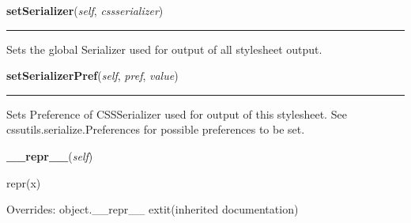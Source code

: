    \label{cssutils:css:cssstylesheet:CSSStyleSheet:setSerializer}

    \vspace{0.5ex}

\hspace{.8\funcindent}\begin{boxedminipage}{\funcwidth}

    \raggedright \textbf{setSerializer}(\textit{self}, \textit{cssserializer})

    \vspace{-1.5ex}

    \rule{\textwidth}{0.5\fboxrule}
\setlength{\parskip}{2ex}

Sets the global Serializer used for output of all stylesheet
output.
\setlength{\parskip}{1ex}
    \end{boxedminipage}

    \label{cssutils:css:cssstylesheet:CSSStyleSheet:setSerializerPref}

    \vspace{0.5ex}

\hspace{.8\funcindent}\begin{boxedminipage}{\funcwidth}

    \raggedright \textbf{setSerializerPref}(\textit{self}, \textit{pref}, \textit{value})

    \vspace{-1.5ex}

    \rule{\textwidth}{0.5\fboxrule}
\setlength{\parskip}{2ex}

Sets Preference of CSSSerializer used for output of this
stylesheet. See cssutils.serialize.Preferences for possible
preferences to be set.
\setlength{\parskip}{1ex}
    \end{boxedminipage}

    \vspace{0.5ex}

\hspace{.8\funcindent}\begin{boxedminipage}{\funcwidth}

    \raggedright \textbf{\_\_repr\_\_}(\textit{self})

\setlength{\parskip}{2ex}
    repr(x)

\setlength{\parskip}{1ex}
      Overrides: object.\_\_repr\_\_ 	extit{(inherited documentation)}

    \end{boxedminipage}


